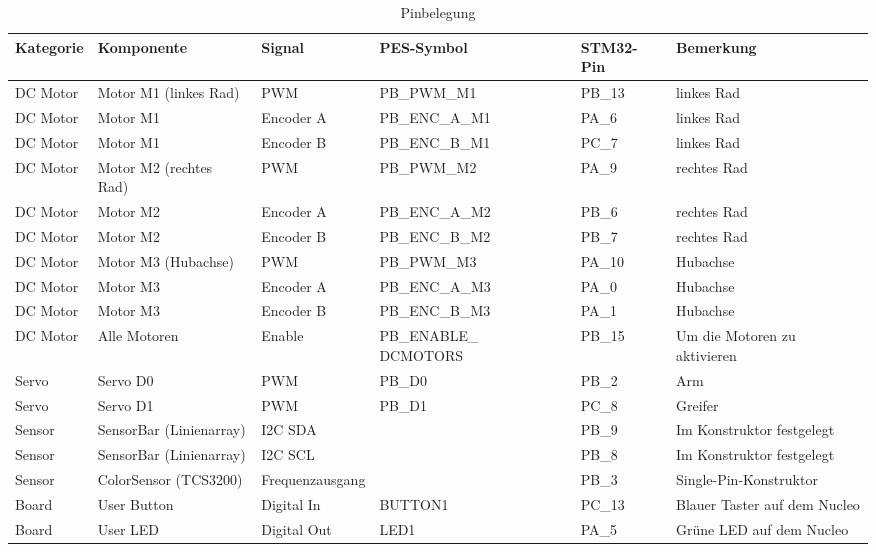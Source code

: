 \documentclass[11pt,a4paper]{article}
\begin{document}
	\begin{table}[H]
		\centering
		\scriptsize
		\caption{Pinbelegung}
		\label{tab:pinbelegung_pes_board}
		\begin{tabularx}{\textwidth}{|p{2.1cm}|p{3.1cm}|p{2.2cm}|X|p{1.5cm}|X|}
			\hline
			\textbf{Kategorie} & \textbf{Komponente} & \textbf{Signal} & \textbf{PES-Symbol} & \textbf{STM32-Pin} & \textbf{Bemerkung} \\
			\hline
			
			DC Motor & Motor M1 (linkes Rad) & PWM & PB\_PWM\_M1 & PB\_13 & linkes Rad\\
			\hline
			DC Motor & Motor M1 & Encoder A & PB\_ENC\_A\_M1 & PA\_6 & linkes Rad \\
			\hline
			DC Motor & Motor M1 & Encoder B & PB\_ENC\_B\_M1 & PC\_7 & linkes Rad \\
			\hline
			DC Motor & Motor M2 (rechtes Rad) & PWM & PB\_PWM\_M2 & PA\_9 & rechtes Rad \\
			\hline
			DC Motor & Motor M2 & Encoder A & PB\_ENC\_A\_M2 & PB\_6 & rechtes Rad \\
			\hline
			DC Motor & Motor M2 & Encoder B & PB\_ENC\_B\_M2 & PB\_7 & rechtes Rad \\
			\hline
			DC Motor & Motor M3 (Hubachse) & PWM & PB\_PWM\_M3 & PA\_10 &  Hubachse\\
			\hline
			DC Motor & Motor M3 & Encoder A & PB\_ENC\_A\_M3 & PA\_0 & Hubachse \\
			\hline
			DC Motor & Motor M3 & Encoder B & PB\_ENC\_B\_M3 & PA\_1 & Hubachse \\
			\hline
			DC Motor & Alle Motoren & Enable & PB\_ENABLE\_ DCMOTORS & PB\_15 & Um die Motoren zu aktivieren \\
			\hline
			
			Servo & Servo D0 & PWM & PB\_D0 & PB\_2 & Arm \\
			\hline
			Servo & Servo D1 & PWM & PB\_D1 & PC\_8 & Greifer\\
			\hline
			
			Sensor & SensorBar (Linienarray) & I2C SDA &  & PB\_9 & Im Konstruktor festgelegt \\
			\hline
			Sensor & SensorBar (Linienarray) & I2C SCL &  & PB\_8 & Im Konstruktor festgelegt \\
			\hline
			Sensor & ColorSensor (TCS3200) & Frequenzausgang &  & PB\_3 & Single-Pin-Konstruktor \\
			\hline
			
			Board & User Button & Digital In & BUTTON1 & PC\_13 & Blauer Taster auf dem Nucleo \\
			\hline
			Board & User LED & Digital Out & LED1 & PA\_5 & Grüne LED auf dem Nucleo \\
			\hline
			
			
		\end{tabularx}
	\end{table}
\end{document}
